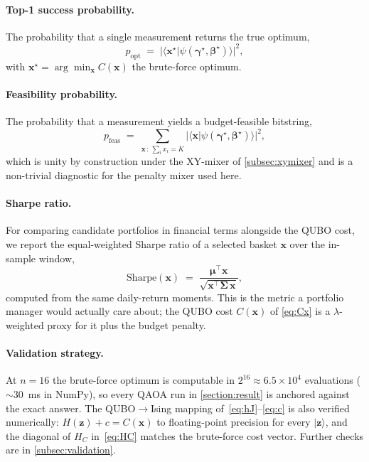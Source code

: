 \paragraph{Top-1 success probability.}
The probability that a single measurement returns the true optimum,
\begin{equation}\label{eq:popt}
    p_{\text{opt}} \;=\; \bigl|\langle \boldsymbol{x}^\star | \psi(\boldsymbol\gamma^\star,\boldsymbol\beta^\star)\rangle\bigr|^2,
\end{equation}
with $\boldsymbol{x}^\star = \arg\min_{\boldsymbol{x}} C(\boldsymbol{x})$ the brute-force optimum.

\paragraph{Feasibility probability.}
The probability that a measurement yields a budget-feasible bitstring,
\begin{equation}\label{eq:pfeas}
    p_{\text{feas}} \;=\; \sum_{\boldsymbol{x}\,:\,\sum_i x_i = K} \bigl|\langle \boldsymbol{x} | \psi(\boldsymbol\gamma^\star,\boldsymbol\beta^\star)\rangle\bigr|^2,
\end{equation}
which is unity by construction under the XY-mixer of \cref{subsec:xymixer} and is a non-trivial diagnostic for the penalty mixer used here.

\paragraph{Sharpe ratio.}
For comparing candidate portfolios in financial terms alongside the QUBO cost, we report the equal-weighted Sharpe ratio of a selected basket $\boldsymbol{x}$ over the in-sample window,
\begin{equation}\label{eq:sharpe}
    \mathrm{Sharpe}(\boldsymbol{x}) \;=\; \frac{\boldsymbol{\mu}^\top \boldsymbol{x}}{\sqrt{\boldsymbol{x}^\top \boldsymbol{\Sigma}\, \boldsymbol{x}}},
\end{equation}
computed from the same daily-return moments. This is the metric a portfolio manager would actually care about; the QUBO cost $C(\boldsymbol{x})$ of \eqref{eq:Cx} is a $\lambda$-weighted proxy for it plus the budget penalty.

\paragraph{Validation strategy.}
At $n = 16$ the brute-force optimum is computable in $2^{16}\approx 6.5\times 10^4$ evaluations ($\sim 30$~ms in NumPy), so every QAOA run in \cref{section:result} is anchored against the exact answer. The QUBO$\to$Ising mapping of~\eqref{eq:hJ}--\eqref{eq:c} is also verified numerically: $H(\boldsymbol{z}) + c = C(\boldsymbol{x})$ to floating-point precision for every $|\boldsymbol{z}\rangle$, and the diagonal of $H_C$ in~\eqref{eq:HC} matches the brute-force cost vector. Further checks are in \cref{subsec:validation}.
